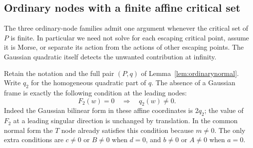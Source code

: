\subsection{Ordinary nodes with a finite affine critical set}
\label{sec:ordinaryfinite}

The three ordinary-node families admit one argument whenever the
critical set of $P$ is finite. In particular we need not solve for
each escaping critical point, assume it is Morse, or separate its
action from the actions of other escaping points. The Gaussian
quadratic itself detects the unwanted contribution at infinity.

Retain the notation and the full pair $(P,q)$ of
Lemma~\ref{lem:ordinarynormal}. Write $q_2$ for the homogeneous
quadratic part of $q$. The absence of a Gaussian frame is exactly
the following condition at the leading nodes:
\begin{equation}\label{eq:nodenoframe}
 F_2(w)=0\quad\Longrightarrow\quad q_2(w)\ne0.
\end{equation}
Indeed the Gaussian bilinear form in these affine coordinates is
$2q_2$; the value of $F_2$ at a leading singular direction is
unchanged by translation. In the common normal form the $T$ node
already satisfies this condition because $m\ne0$. The only extra
conditions are $c\ne0$ or $B\ne0$ when $d=0$, and $b\ne0$ or
$A\ne0$ when $a=0$.

